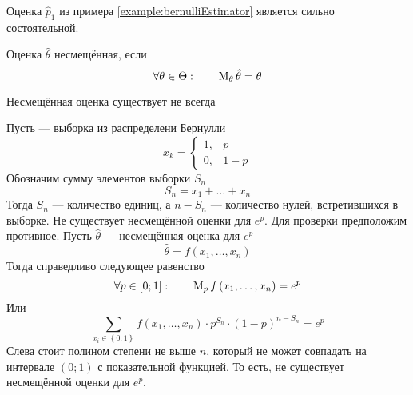 \begin{example}
  Оценка $\hat{p}_1$ из примера \ref{example:bernulliEstimator}
  является сильно состоятельной.
\end{example}

\begin{definition}
  \label{def:estimatorBias}
  Оценка $\hat{\theta}$ несмещённая, если
  \begin{equation*}
    \forall\theta\in\Theta: \qquad \operatorname{M}_{\theta} \hat{\theta} = \theta
  \end{equation*}
\end{definition}

\begin{remark}
  Несмещённая оценка существует не всегда
\end{remark}

\begin{example}
  Пусть \xsample --- выборка из распределени Бернулли
  \begin{equation*}
    x_k =
    \begin{cases}
      1,& p \\
      0,& 1-p
    \end{cases}
  \end{equation*}
  Обозначим сумму элементов выборки $S_n$
  \begin{equation*}
    S_n = x_1 + \dots + x_n
  \end{equation*}
  Тогда $S_n$ --- количество единиц, а $n-S_n$ --- количество нулей,
  встретившихся в выборке.
  Не существует несмещённой оценки для $e^p$.
  Для проверки предположим противное.
  Пусть $\hat{\theta}$ --- несмещённая оценка для $e^p$
  \begin{equation*}
    \hat{\theta} = f\left( x_1, \dots, x_n \right)
  \end{equation*}
  Тогда справедливо следующее равенство
  \begin{equation*}
    \forall p \in \left[ 0; 1 \right]:\qquad
    \operatorname{M}_{p} f\left( x_1, \dots, x_n \right)
    = e^p
  \end{equation*}
  Или
  \begin{equation*}
    \sum_{x_i \in \left\{ 0, 1 \right\}} f\left( x_1, \dots, x_n \right)
      \cdot p^{S_n} \cdot \left( 1 - p \right)^{n - S_n}
    = e^p
  \end{equation*}
  Слева стоит полином степени не выше $n$, который не может совпадать на
  интервале $\left( 0; 1 \right)$ с показательной функцией.
  То есть, не существует несмещённой оценки для $e^p$.
\end{example}

